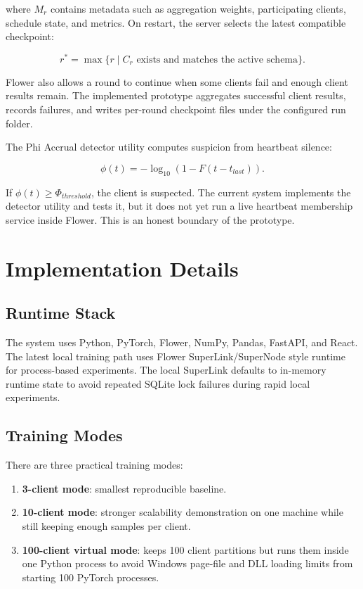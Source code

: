 \documentclass[conference]{IEEEtran}
\begin{document}
where \(M_r\) contains metadata such as aggregation weights, participating
clients, schedule state, and metrics. On restart, the server selects the latest
compatible checkpoint:

\begin{equation}
r^*=\max\{r\mid C_r \text{ exists and matches the active schema}\}.
\end{equation}

Flower also allows a round to continue when some clients fail and enough client
results remain. The implemented prototype aggregates successful client results,
records failures, and writes per-round checkpoint files under the configured
run folder.

The Phi Accrual detector utility computes suspicion from heartbeat silence:

\begin{equation}
\phi(t)=-\log_{10}(1-F(t-t_{last})).
\end{equation}

If \(\phi(t)\geq\Phi_{threshold}\), the client is suspected. The current system
implements the detector utility and tests it, but it does not yet run a live
heartbeat membership service inside Flower. This is an honest boundary of the
prototype.

\section{Implementation Details}

\subsection{Runtime Stack}

The system uses Python, PyTorch, Flower, NumPy, Pandas, FastAPI, and React. The
latest local training path uses Flower SuperLink/SuperNode style runtime for
process-based experiments. The local SuperLink defaults to in-memory runtime
state to avoid repeated SQLite lock failures during rapid local experiments.

\subsection{Training Modes}

There are three practical training modes:

\begin{enumerate}
  \item \textbf{3-client mode}: smallest reproducible baseline.
  \item \textbf{10-client mode}: stronger scalability demonstration on one
        machine while still keeping enough samples per client.
  \item \textbf{100-client virtual mode}: keeps 100 client partitions but runs
        them inside one Python process to avoid Windows page-file and DLL
        loading limits from starting 100 PyTorch processes.
\end{enumerate}
\end{document}
